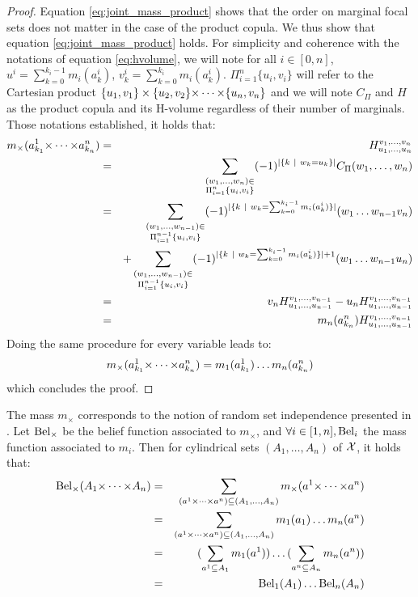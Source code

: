 \begin{proof}
    Equation \eqref{eq:joint_mass_product} shows that the order on marginal focal sets does not matter in the case of the product copula. We thus show that equation \eqref{eq:joint_mass_product} holds.
    For simplicity and coherence with the notations of equation \eqref{eq:hvolume}, we will note for all $i\in[0,n]$, $u^i=\sum_{k=0}^{k_i-1}m_i(a_k^i)$, $v^i_k=\sum_{k=0}^{k_i}m_i(a_k^i)$. $\Pi_{i=1}^n\{u_i, v_i\}$ will refer to the Cartesian product $\{u_1, v_1\}\times\{u_2, v_2\}{\times\dots\times}\{u_n, v_n\}$ and we will note $C_\Pi$ and $H$ as the product copula and its H-volume regardless of their number of marginals. Those notations established, it holds that:
    \begin{eqnarray*}
        m_\times(a^1_{k_1}{\times\dots\times} a^{n}_{k_{n}}) &=& H_{u_1, \dots, u_{n}}^{v_1, \dots, v_{n}}\\
        &=&\sum_{\substack{(w_1, \dots, w_{n})\in\\\Pi_{i=1}^{n}\{u_i, v_i\}}}(-1)^{|\{k~|~w_k=u_k\}|}C_\Pi(w_1, \dots, w_{n})\\
        &=&\sum_{\substack{(w_1, \dots, w_{n-1})\in\\\Pi_{i=1}^{n-1}\{u_i, v_i\}}}(-1)^{|\{k~|~w_k=\sum_{k=0}^{k_i-1}m_i(a^i_k)\}|}(w_1 \dots w_{n-1}v_{n})\\
        && + \sum_{\substack{(w_1, \dots, w_{n-1})\in\\\Pi_{i=1}^{n-1}\{u_i, v_i\}}}(-1)^{|\{k~|~w_k=\sum_{k=0}^{k_i-1}m_i(a^i_k)\}|+1}(w_1 \dots w_{n-1}u_n)\\
        &=& v_{n}H_{u_1, \dots, u_{n-1}}^{v_1, \dots, v_{n-1}} - u_{n}H_{u_1, \dots, u_{n-1}}^{v_1, \dots, v_{n-1}}\\
        &=& m_{n}(a^{n}_{k_{n}})H_{u_1, \dots, u_{n-1}}^{v_1, \dots, v_{n-1}}
    \end{eqnarray*}
    Doing the same procedure for every variable leads to:
    \begin{eqnarray*}
        m_\times(a^1_{k_1}{\times\dots\times} a^n_{k_n}) = m_1(a^1_{k_1})\dots m_n(a^n_{k_n})
    \end{eqnarray*}
    which concludes the proof.
\end{proof}

The mass $m_\times$ corresponds to the notion of random set independence presented in \cite{couso_survey_2000}. Let ${\mathrm{Bel}}_\times$ be the belief function associated to $m_\times$, and $\forall i\in[1,n], {\mathrm{Bel}}_i$ the mass function associated to $m_i$. Then for cylindrical sets $(A_1, \dots, A_n)$ of ${\mathcal{X}}$, it holds that:
\begin{eqnarray}
    {\mathrm{Bel}}_\times(A_1{\times\dots\times} A_n) &=& \sum_{(a^1{\times\dots\times} a^n)\subseteq (A_1, \dots, A_n)}m_\times(a^1{\times\dots\times} a^n)\nonumber\\
    &=& \sum_{(a^1{\times\dots\times} a^n)\subseteq (A_1, \dots, A_n)}m_1(a_1)\dots m_n(a^n)\nonumber\\
    &=& (\sum_{a^1\subseteq A_1}m_1(a^1))\dots(\sum_{a^n\subseteq A_n}m_n(a^n))\nonumber\\
    &=& {\mathrm{Bel}}_1(A_1)\dots {\mathrm{Bel}}_n(A_n)
\end{eqnarray}

